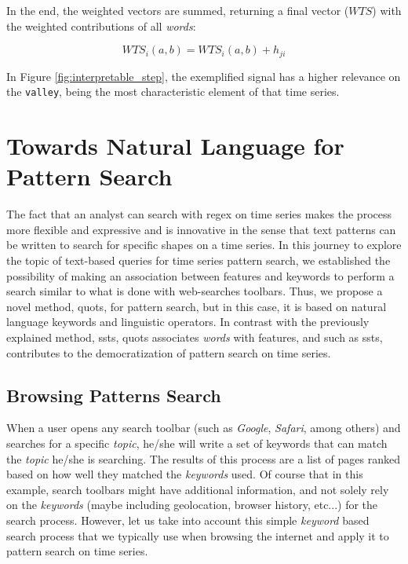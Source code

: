 In the end, the  weighted vectors are summed, returning a final vector ($WTS$) with the weighted contributions of all \textit{words}:

\begin{equation}
WTS_i(a, b) = WTS_i(a, b) + h_{ji}
\end{equation}

In Figure \ref{fig:interpretable_step}, the exemplified signal has a higher relevance on the \texttt{valley}, being the most characteristic element of that time series.

\section{Towards Natural Language for Pattern Search}

The fact that an analyst can search with \gls{regex} on time series makes the process more flexible and expressive and is innovative in the sense that text patterns can be written to search for specific shapes on a time series. In this journey to explore the topic of text-based queries for time series pattern search, we established the possibility of making an association between features and keywords to perform a search similar to what is done with web-searches toolbars. Thus, we propose a novel method, \gls{quots}, for pattern search, but in this case, it is based on natural language keywords and linguistic operators. In contrast with the previously explained method, \gls{ssts}, \gls{quots} associates \textit{words} with features, and such as \gls{ssts}, contributes to the democratization of pattern search on time series.

\subsection{Browsing Patterns Search}

When a user opens any search toolbar (such as \textit{Google}, \textit{Safari}, among others) and searches for a specific \textit{topic}, he/she will write a set of keywords that can match the \textit{topic} he/she is searching. The results of this process are a list of pages ranked based on how well they matched the \textit{keywords} used. Of course that in this example, search toolbars might have additional information, and not solely rely on the \textit{keywords} (maybe including geolocation, browser history, etc...) for the search process. However, let us take into account this simple \textit{keyword} based search process that we typically use when browsing the internet and apply it to pattern search on time series.

